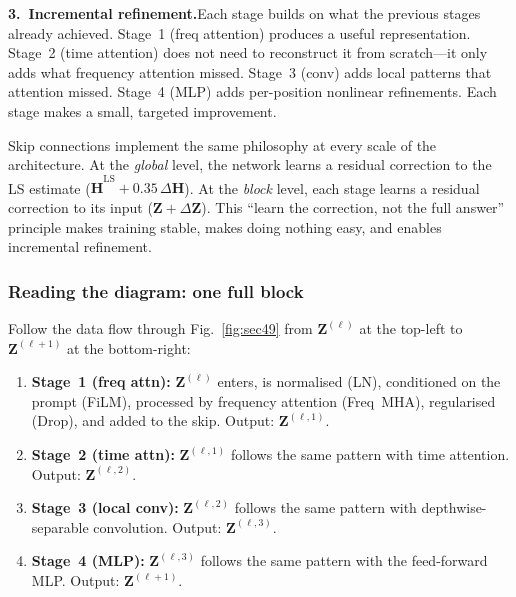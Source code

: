 \documentclass[11pt,a4paper]{article}
\newcommand{\bH}{\mathbf{H}}
\newcommand{\bZ}{\mathbf{Z}}
\begin{document}
	\textbf{3.\ Incremental refinement.}\quad Each stage builds on what the previous stages already achieved.  Stage~1 (freq attention) produces a useful representation.  Stage~2 (time attention) does not need to reconstruct it from scratch---it only adds what frequency attention missed.  Stage~3 (conv) adds local patterns that attention missed.  Stage~4 (MLP) adds per-position nonlinear refinements.  Each stage makes a small, targeted improvement.
	
	\begin{keyidea}
		Skip connections implement the same philosophy at every scale of the architecture.  At the \emph{global} level, the network learns a residual correction to the LS estimate ($\widehat{\bH}^{\mathrm{LS}} + 0.35\,\Delta\widehat{\bH}$).  At the \emph{block} level, each stage learns a residual correction to its input ($\bZ + \Delta\bZ$).  This ``learn the correction, not the full answer'' principle makes training stable, makes doing nothing easy, and enables incremental refinement.
	\end{keyidea}
	
	\subsubsection*{Reading the diagram: one full block}
	
	Follow the data flow through Fig.~\ref{fig:sec49} from $\bZ^{(\ell)}$ at the top-left to $\bZ^{(\ell+1)}$ at the bottom-right:
	
	\begin{enumerate}[nosep]
		\item \textbf{Stage~1 (freq attn):} $\bZ^{(\ell)}$ enters, is normalised (LN), conditioned on the prompt (FiLM), processed by frequency attention (Freq~MHA), regularised (Drop), and added to the skip.  Output: $\bZ^{(\ell,1)}$.
		
		\item \textbf{Stage~2 (time attn):} $\bZ^{(\ell,1)}$ follows the same pattern with time attention.  Output: $\bZ^{(\ell,2)}$.
		
		\item \textbf{Stage~3 (local conv):} $\bZ^{(\ell,2)}$ follows the same pattern with depthwise-separable convolution.  Output: $\bZ^{(\ell,3)}$.
		
		\item \textbf{Stage~4 (MLP):} $\bZ^{(\ell,3)}$ follows the same pattern with the feed-forward MLP.  Output: $\bZ^{(\ell+1)}$.
	\end{enumerate}
	
\end{document}
